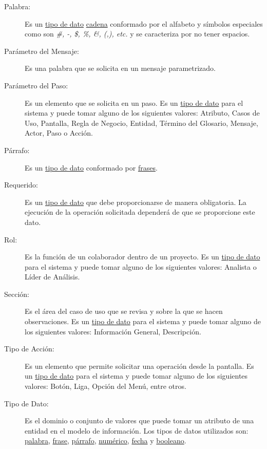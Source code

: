 \begin{description}
	\item[\hypertarget{tPalabra}{Palabra:}] Es un \hyperlink{tTipoDato}{tipo de dato} \hyperlink{tCadena}{cadena} conformado por el alfabeto y símbolos especiales como son {\em \#, -,
	\$, \%, \&, (,), etc.} y se caracteriza por no tener espacios.
	
	\item[\hypertarget{tParametroM}{Parámetro del Mensaje:}] Es una palabra que se solicita en un mensaje parametrizado.
	
	\item[\hypertarget{tParametroP}{Parámetro del Paso:}] Es un elemento que se solicita en un paso. Es un \hyperlink{tTipoDato}{tipo de dato} para el sistema y puede tomar alguno de los siguientes valores: Atributo, Casos de Uso, Pantalla, Regla de Negocio, Entidad, Término del Glosario, Mensaje, Actor, Paso o Acción.
	
	\item[\hypertarget{tParrafo}{Párrafo:}] Es un \hyperlink{tTipoDato}{tipo de dato} conformado por \hyperlink{tFrase}{frases}.
	
	\item[\hypertarget{tRequerido}{Requerido:}] Es un \hyperlink{tTipoDato}{tipo de dato} que debe proporcionarse de manera obligatoria. La ejecución de la operación solicitada dependerá de que se proporcione este dato.
	
	\item[\hypertarget{tRol}{Rol:}] Es la función de un colaborador dentro de un proyecto. Es un \hyperlink{tTipoDato}{tipo de dato} para el sistema y puede tomar alguno de los siguientes valores: Analista o Líder de Análisis.
	
	\item[\hypertarget{tSeccion}{Sección:}] Es el área del caso de uso que se revisa y sobre la que se hacen observaciones. Es un \hyperlink{tTipoDato}{tipo de dato} para el sistema y puede tomar alguno de los siguientes valores: Información General, Descripción.
	
	\item[\hypertarget{tTipoAcc}{Tipo de Acción:}] Es un elemento que permite solicitar una operación desde la pantalla. Es un \hyperlink{tTipoDato}{tipo de dato} para el sistema y puede tomar alguno de los siguientes valores: Botón, Liga, Opción del Menú, entre otros.
	
	\item[\hypertarget{tTipoDato}{Tipo de Dato:}] Es el dominio o conjunto de valores que puede tomar un atributo de una entidad en el modelo de información. Los tipos de datos utilizados son: \hyperlink{tPalabra}{palabra}, \hyperlink{tFrase}{frase}, \hyperlink{tParrafo}{párrafo}, \hyperlink{tNumerico}{numérico}, \hyperlink{tFecha}{fecha} y \hyperlink{tBooleano}{booleano}.
	

\end{description}
